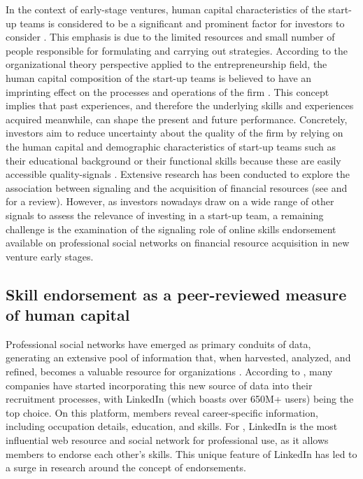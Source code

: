\documentclass[12pt]{article}
\begin{document}
In the context of early-stage ventures, human capital characteristics of the start-up teams is considered to be a significant and prominent factor for investors to consider \citep{beckman2007early, ko2018signaling, matusik2008values}. This emphasis is due to the limited resources and small number of people responsible for formulating and carrying out strategies. According to the organizational theory perspective applied to the entrepreneurship field, the human capital composition of the start-up teams is believed to have an imprinting effect on the processes and operations of the firm \citep{packalen2007complementing}. This concept implies that past experiences, and therefore the underlying skills and experiences acquired meanwhile, can shape the present and future performance. Concretely, investors aim to reduce uncertainty about the quality of the firm by relying on the human capital and demographic characteristics of start-up teams such as their educational background or their functional skills because these are easily accessible quality-signals \citep{colombo2005founders, beckman2007early, eddleston2016you, plummer2016better}. Extensive research has been conducted to explore the association between signaling and the acquisition of financial resources (see \citep{connelly2011signaling} and \citet{colombo2021use} for a review). However, as investors nowadays draw on a wide range of other signals to assess the relevance of investing in a start-up team, a remaining challenge is the examination of the signaling role of online skills endorsement available on professional social networks \citep{drakopoulos2020building, perez2016endorsement, rapanta2017linkedin, yan2019social} on financial resource acquisition in new venture early stages.

\subsection{Skill endorsement as a peer-reviewed measure of human capital}

Professional social networks have emerged as primary conduits of data, generating an extensive pool of information that, when harvested, analyzed, and refined, becomes a valuable resource for organizations \citep{ponte2022use}. According to \citep{urdaneta2021lifelong}, many companies have started incorporating this new source of data into their recruitment processes, with LinkedIn (which boasts over 650M+ users) being the top choice. On this platform, members reveal career-specific information, including occupation details, education, and skills. For \citep{rapanta2017linkedin}, LinkedIn is the most influential web resource and social network for professional use, as it allows members to endorse each other's skills. This unique feature of LinkedIn has led to a surge in research around the concept of endorsements.
\end{document}
